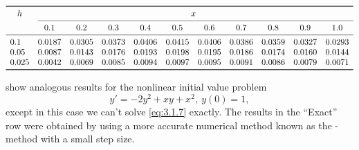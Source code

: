 \begin{table}
\caption{Errors in approximate solutions of $y'+2y=x^3e^{-2x},\
y(0)=1$, obtained by Euler's method.}
\label{table:3.1.2}
\[
\begin{array}{S[table-format=1.3] *{10}{c}}\toprule
{h}&\multicolumn{10}{c}{x}\\\cmidrule(l){2-11}
&0.1&0.2&0.3&0.4&0.5&0.6&0.7&0.8&0.9&1.0\\\midrule
0.1&
0.0187&0.0305&0.0373&0.0406&0.0415&0.0406&0.0386&0.0359&0.0327&0.0293\\
0.05&
0.0087&0.0143&0.0176&0.0193&0.0198&0.0195&0.0186&0.0174&0.0160&0.0144\\
0.025&
0.0042&0.0069&0.0085&0.0094&0.0097&0.0095&0.0091&0.0086&0.0079&0.0071\\
\bottomrule
\end{array}
\]
\end{table}

\begin{example}\label{example:3.1.3}
 show analogous results
for the nonlinear initial value problem
\begin{equation} \label{eq:3.1.7}
y'=-2y^2+xy+x^2,\ y(0)=1,
\end{equation}
except in this case we can't solve \eqref{eq:3.1.7} exactly.
The results in the ``Exact'' row were obtained by using a
more accurate numerical method known as the
-
method with a small step size.
\end{example}


